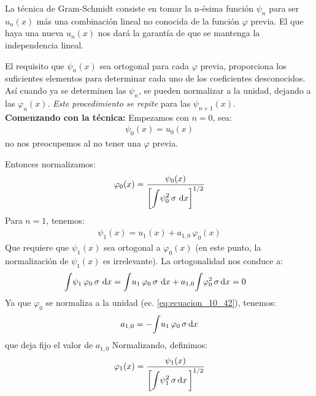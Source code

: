 \documentclass[12pt]{article}
\def\scaleint#1{\vcenter{\hbox{\scaleto[3ex]{\displaystyle\int}{#1}}}}
\numberwithin{equation}{section}
\begin{document}
La técnica de Gram-Schmidt consiste en tomar la n-ésima función $\psi_{n}$ para ser $u_{n}(x)$ más una combinación lineal no conocida de la función $\varphi$ previa. El que haya una nueva $u_{n}(x)$ nos dará la garantía de que se mantenga la independencia lineal.
\par
El requisito que $\psi_{n}(x)$ sea ortogonal para cada $\varphi$ previa, proporciona los suficientes elementos para determinar cada uno de los coeficientes desconocidos. Así cuando ya se determinen las $\psi_{n}$, se pueden normalizar a la unidad, dejando a las  $\varphi_{n} (x)$.  \emph{Este procedimiento se repite} para las $\psi_{n+1}(x)$.
\\[0.5em]
\textbf{Comenzando con la técnica: } Empezamos con $n = 0$, sea:
\begin{align}
\psi_{0} (x) = u_{0} (x)
\label{eq:ecuacion_10_41}
\end{align}
no nos preocupemos al no tener una $\varphi$ previa.
\par
Entonces normalizamos:
\begin{align}
\varphi_{0}(x) = \dfrac{\psi_{0} (x)}{\left[ \displaystyle \scaleint{5ex} \psi_{0}^{2} \, \sigma \, \dd{x} \right]^{1/2}}
\label{eq:ecuacion_10_42}
\end{align}
Para $n = 1$, tenemos:
\begin{align}
\psi_{1} (x) = u_{1} (x) + a_{1, 0} \, \varphi_{0} (x)
\label{eq:ecuacion_10_43}
\end{align}
Que requiere que $\psi_{1} (x)$ sea ortogonal a $\varphi_{0} (x)$ (en este punto, la normalización de $\psi_{1} (x)$ es irrelevante). La ortogonalidad nos conduce a:
\begin{eqnarray}
\begin{aligned}[b]
\scaleint{5ex} \psi_{1} \, \varphi_{0} \, \sigma \, \dd{x} &=  \scaleint{5ex} u_{1} \, \varphi_{0} \, \sigma \, \dd{x} + a_{1,0} \scaleint{5ex} \varphi_{0}^{2} \, \sigma \dd{x} = 0
\end{aligned}
\label{eq:ecuacion_10_44}
\end{eqnarray}
Ya que $\varphi_{0}$ se normaliza a la unidad (ec. \ref{eq:ecuacion_10_42}), tenemos:
\begin{align}
a_{1,0} = - \scaleint{5ex} u_{1} \, \varphi_{0} \, \sigma \dd{x}
\label{eq:ecuacion_10_45}
\end{align}
que deja fijo el valor de $a_{1, 0}$
Normalizando, definimos:
\begin{align}
\varphi_{1} (x) = \dfrac{\psi_{1} (x)}{ \bigg[ \displaystyle \scaleint{5ex} \psi_{1}^{2} \, \sigma \dd{x} \bigg]^{1/2}}
\label{eq:ecuacion_10_46}
\end{align}
\end{document}
